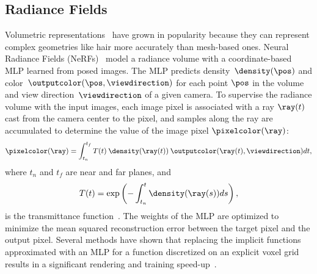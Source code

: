   \subsection{Radiance Fields}
    Volumetric representations~\cite{vicini2021nonexponential} have grown in
    popularity because they can represent complex geometries like hair more
    accurately than mesh-based ones.
    Neural Radiance Fields (NeRFs)~\cite{mildenhall2020nerf} model a radiance
    volume with a coordinate-based MLP learned from posed images.
    The MLP predicts density~$\density(\pos)$ and color~$\outputcolor(\pos,
    \viewdirection)$ for each point $\pos$ in the volume and view
    direction~$\viewdirection$ of a given camera.
    To supervise the radiance volume with the input images, each image pixel is associated with a ray $\ray(t)$ cast from the camera center to the pixel, and samples along the ray are accumulated to determine the value of the image pixel $\pixelcolor(\ray)$:
    \begin{equation}
      \label{eq:rendering-equation}
      \pixelcolor(\ray)=\int^{t_f}_{t_n}T(t)\:\density(\ray(t))\:\outputcolor(\ray(t), \viewdirection)dt,
    \end{equation}
    where $t_n$ and $t_f$ are near and far planes, and
    \begin{equation}
      T(t) = \exp\left(-\int^t_{t_n}\density(\ray(s))ds\right) ,
      \end{equation} is the transmittance
      function~\cite{tagliasacchi2022volume}.
    The weights of the MLP are optimized to minimize the mean squared
    reconstruction error between the target pixel and the output pixel.
    Several methods have shown that replacing the implicit functions
    approximated with an MLP for a function discretized on an explicit voxel
    grid results in a significant rendering and training
    speed-up~\cite{garbin2021fastnerf, hedman2021baking, plenoctrees,
    directVoxelOptimisation, neuralSparseVoxelFields}.

